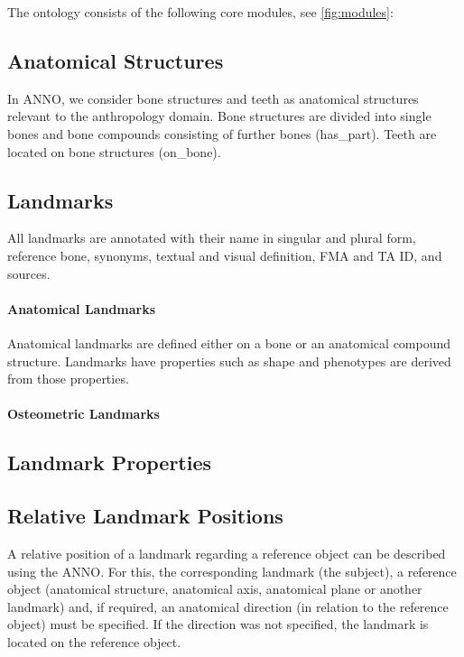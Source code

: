 \documentclass[sw]{iosart2x}
\begin{document}
The ontology consists of the following core modules, see \cref{fig:modules}:
\subsection{Anatomical Structures}\label{sec:bone}

In ANNO, we consider bone structures and teeth as anatomical structures relevant to the anthropology domain. 
Bone structures are divided into single bones and bone compounds consisting of further bones (has\_part). 
Teeth are located on bone structures (on\_bone). 

\subsection{Landmarks}\label{sec:landmark}
All landmarks are annotated with their name in singular and plural form, reference bone, synonyms, textual and visual definition, FMA and TA ID, and sources.


\paragraph{Anatomical Landmarks}
Anatomical landmarks are defined either on a bone or an anatomical compound structure.
Landmarks have properties such as shape and phenotypes are derived from those properties.

\paragraph{Osteometric Landmarks}

\subsection{Landmark Properties}

\subsection{Relative Landmark Positions}

A relative position of a landmark regarding a reference object can be described using the ANNO. 
For this, the corresponding landmark (the subject), a reference object 
(anatomical structure, anatomical axis, anatomical plane or another landmark) and, if required, an anatomical direction 
(in relation to the reference object) must be specified. If the direction was not specified, the landmark is located on the reference object.
\end{document}
